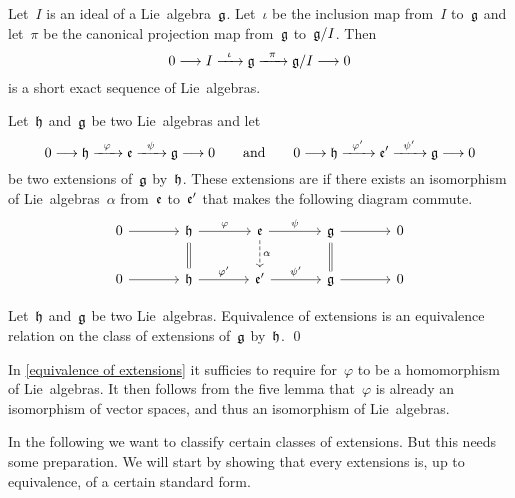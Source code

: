 \begin{example}
	\label{generic short exact sequence}
	Let~$I$ is an ideal of a Lie~algebra~$\mathfrak{g}$.
	Let~$\iota$ be the inclusion map from~$I$ to~$\mathfrak{g}$ and let~$\pi$ be the canonical projection map from~$\mathfrak{g}$ to~$\mathfrak{g}/I$.
	Then
	\[
		0
		\to
		I
		\xto{\iota}
		\glie
		\xto{\pi}
		\glie/I
		\to
		0
	\]
	is a short exact sequence of Lie~algebras.
\end{example}


\begin{definition}
	\label{equivalence of extensions}
	Let~$\mathfrak{h}$ and~$\mathfrak{g}$ be two Lie~algebras and let
	\[
		0 
		\to
		\hlie
		\xto{\varphi}
		\elie
		\xto{\psi}
		\glie
		\to
		0
		\qquad\text{and}\qquad
		0 
		\to
		\hlie
		\xto{\varphi'}
		\elie'
		\xto{\psi'}
		\glie
		\to
		0
	\]
	be two extensions of~$\mathfrak{g}$ by~$\mathfrak{h}$.
	These extensions are  if there exists an isomorphism of Lie~algebras~$\alpha$ from~$\mathfrak{e}$ to~$\mathfrak{e}'$ that makes the following diagram commute.
	\[
		\begin{tikzcd}[column sep = large]
			0
			\arrow{r}
			&
			\hlie
			\arrow{r}[above]{\varphi}
			\arrow[equal]{d}
			&
			\elie
			\arrow{r}[above]{\psi}
			\arrow[dashed]{d}[right]{\alpha}
			&
			\glie
			\arrow{r}
			\arrow[equal]{d}
			&
			0
			\\
			0
			\arrow{r}
			&
			\hlie
			\arrow{r}[above]{\varphi'}
			&
			\elie'
			\arrow{r}[above]{\psi'}
			&
			\glie
			\arrow{r}
			&
			0
		\end{tikzcd}
	\]
\end{definition}


\begin{proposition}
	Let~$\mathfrak{h}$ and~$\mathfrak{g}$ be two Lie~algebras.
	Equivalence of extensions is an equivalence relation on the class of extensions of~$\mathfrak{g}$ by~$\mathfrak{h}$.
	\qed
\end{proposition}


\begin{remark}
	In \cref{equivalence of extensions} it sufficies to require for~$\varphi$ to be a homomorphism of Lie~algebras.
	It then follows from the five lemma that~$\varphi$ is already an isomorphism of vector spaces, and thus an isomorphism of Lie~algebras.
\end{remark}


\begin{fluff}
	In the following we want to classify certain classes of extensions.
	But this needs some preparation.
	We will start by showing that every extensions is, up to equivalence, of a certain standard form.
\end{fluff}



